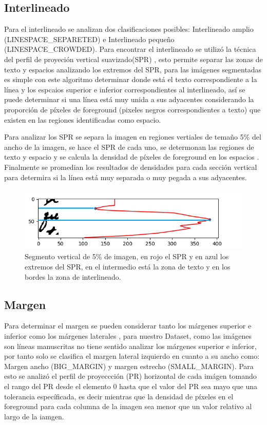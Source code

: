 \documentclass[10pt, a4paper]{article}
\begin{document}
        \subsection{Interlineado} 

            Para el interlineado se analizan dos clasificaciones posibles: Interlineado amplio (LINESPACE\_SEPARETED) e Interlineado peque\~no (LINESPACE\_CROWDED). Para encontrar el interlineado se utiliz\'o la t\'ecnica del perfil 
            de proyeci\'on vertical suavizado(SPR) \cite{20}, esto permite separar las zonas de texto y espacios analizando los extremos del SPR, para las im\'agenes segmentadas es simple con este algoritmo determinar donde est\'a el texto correspondiente a la l\'inea y los espcaios superior e inferior
            correspondientes al interlineado, as\'i se puede determinar si una l\'inea est\'a muy unida a sus adyacentes considerando la proporci\'on de p\'ixeles de foreground (pixeles negros correspondientes a texto) que existen en 
            las regiones identificadas como espacio.

            Para analizar los SPR se separa la imagen en regiones vertiales de tema\~no 5\% del ancho de la imagen, se hace el SPR de cada uno, se determonan las regiones de texto y espacio \cite{22} y se calcula la densidad 
            de p\'ixeles de foreground en los espacios . Finalmente se promedian los resultados de densidades para cada secci\'on vertical para determira si la l\'inea est\'a muy separada o muy pegada a sus adyacentes. 

            \begin{figure}[!h]
                \centering
                \includegraphics[width = 0.5\linewidth]{Figure_1.png}
                \caption{Segmento vertical de 5\% de imagen, en rojo el SPR y en azul los extremos del SPR, en el intermedio est\'a la zona de texto y en los bordes la zona de interlineado.}
            \end{figure}
        \subsection{Margen} 
        
            Para determinar el margen se pueden considerar tanto los m\'argenes superior e inferior como los m\'argenes laterales \cite{21}, para nuestro Dataset, como las im\'agenes son l\'ineas manuscritas no tiene sentido analizar los m\'argenes superior e inferior, por tanto solo 
            se clasifica el margen lateral izquierdo en cuanto a su ancho como: Margen ancho (BIG\_MARGIN) y margen estrecho (SMALL\_MARGIN). Para esto se analiz\'o el perfil de proyeccci\'on (PR) horizontal de cada im\'agen tomando el rango del PR desde el elemento 0 hasta que el valor del PR 
            sea mayo que una tolerancia espec\'ificada, es decir mientras que la densidad de p\'ixeles en el foreground para cada columna de la imagen sea menor que un valor relativo al largo de la iamgen. 
\end{document}
